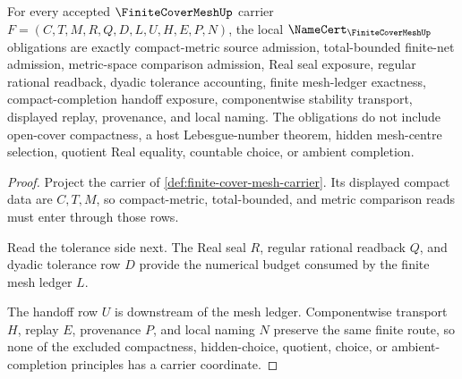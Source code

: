 \begin{theorem}
\label{thm:finite-cover-mesh-namecert-obligations}
For every accepted $\FiniteCoverMeshUp$ carrier $F=(C,T,M,R,Q,D,L,U,H,E,P,N)$, the local $\NameCert_{\FiniteCoverMeshUp}$ obligations are exactly compact-metric source admission, total-bounded finite-net admission, metric-space comparison admission, Real seal exposure, regular rational readback, dyadic tolerance accounting, finite mesh-ledger exactness, compact-completion handoff exposure, componentwise stability transport, displayed replay, provenance, and local naming. The obligations do not include open-cover compactness, a host Lebesgue-number theorem, hidden mesh-centre selection, quotient Real equality, countable choice, or ambient completion.
\end{theorem}
\begin{proof}
Project the carrier of \autoref{def:finite-cover-mesh-carrier}. Its displayed compact data are $C,T,M$, so compact-metric, total-bounded, and metric comparison reads must enter through those rows.

Read the tolerance side next. The Real seal $R$, regular rational readback $Q$, and dyadic tolerance row $D$ provide the numerical budget consumed by the finite mesh ledger $L$.

The handoff row $U$ is downstream of the mesh ledger. Componentwise transport $H$, replay $E$, provenance $P$, and local naming $N$ preserve the same finite route, so none of the excluded compactness, hidden-choice, quotient, choice, or ambient-completion principles has a carrier coordinate.
\end{proof}

